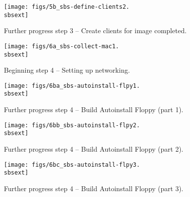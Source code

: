 \begin{figure}[htbp]
  \begin{center}
    \texttt{[image: figs/5b\_sbs-define-clients2.\\sbsext]}
    \caption{Further progress step 3 -- Create clients for image completed.}
    \label{fig:sbs-define-clients2}
  \end{center}
\end{figure}


\begin{figure}[htbp]
  \begin{center}
    \texttt{[image: figs/6a\_sbs-collect-mac1.\\sbsext]}
    \caption{Beginning step 4 -- Setting up networking.}
    \label{fig:sbs-setup-network1}
  \end{center}
\end{figure}



\begin{figure}[htbp]
  \begin{center}
    \texttt{[image: figs/6ba\_sbs-autoinstall-flpy1.\\sbsext]}
    \caption{Further progress step 4 -- Build Autoinstall Floppy (part 1).}
    \label{fig:sbs-autoinstall-flpy1}
  \end{center}
\end{figure}

\begin{figure}[htbp]
  \begin{center}
    \texttt{[image: figs/6bb\_sbs-autoinstall-flpy2.\\sbsext]}
    \caption{Further progress step 4 -- Build Autoinstall Floppy (part 2).}
    \label{fig:sbs-autoinstall-flpy2}
  \end{center}
\end{figure}


\begin{figure}[htbp]
  \begin{center}
    \texttt{[image: figs/6bc\_sbs-autoinstall-flpy3.\\sbsext]}
    \caption{Further progress step 4 -- Build Autoinstall Floppy (part 3).}
    \label{fig:sbs-autoinstall-flpy3}
  \end{center}
\end{figure}

